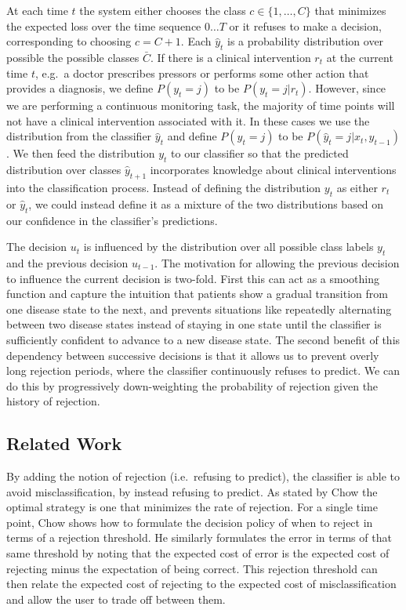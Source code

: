 \documentclass[12pt,solutions]{article}
\newcommand{\yh}{\hat{y}}
\begin{document}
At each time $t$ the system either chooses the class $c \in \{1,\ldots, C\}$ that minimizes the expected loss over the time sequence $0\ldots T$ or it refuses to make a decision, corresponding to choosing $c = C+1$. Each $\yh_t$ is a probability distribution over possible the possible classes $\bar{C}$. If there is a clinical intervention $r_t$ at the current time $t$, e.g.\ a doctor prescribes pressors or performs some other action that provides a diagnosis, we define $P(y_t=j)$ to be $P(y_t=j|r_t)$. However, since we are performing a continuous monitoring task, the majority of time points will not have a clinical intervention associated with it. In these cases we use the distribution from the classifier $\yh_t$ and define $P(y_t=j)$ to be $P(\yh_t=j|x_t, y_{t-1})$. We then feed the distribution $y_t$ to our classifier so that the predicted distribution over classes $\yh_{t+1}$ incorporates knowledge about clinical interventions into the classification process. Instead of defining the distribution $y_t$ as either $r_t$ or $\yh_t$, we could instead define it as a mixture of the two distributions based on our confidence in the classifier's predictions. 

The decision $u_t$ is influenced by the distribution over all possible class labels $y_t$ and the previous decision $u_{t-1}$. The motivation for allowing the previous decision to influence the current decision is two-fold. First this can act as a smoothing function and capture the intuition that patients show a gradual transition from one disease state to the next, and prevents situations like repeatedly alternating between two disease states instead of staying in one state until the classifier is sufficiently confident to advance to a new disease state. The second benefit of this dependency between successive decisions is that it allows us to prevent overly long rejection periods, where the classifier continuously refuses to predict. We can do this by progressively down-weighting the probability of rejection given the history of rejection.

\subsection{Related Work}

By adding the notion of rejection (i.e.\  refusing to predict), the classifier is able to avoid misclassification, by instead refusing to predict. As stated by Chow \cite{Chow1970} the optimal strategy is one that minimizes the rate of rejection. For a single time point, Chow shows how to formulate the decision policy of when to reject in terms of a rejection threshold. He similarly formulates the error in terms of that same threshold by noting that the expected cost of error is the expected cost of rejecting minus the expectation of being correct. This rejection threshold can then relate the expected cost of rejecting to the expected cost of misclassification and allow the user to trade off between them. 
\end{document}
